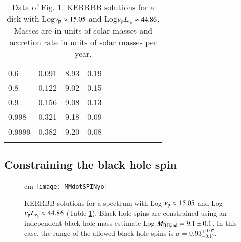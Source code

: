 \documentclass{aa}
\begin{document}
\begin{table}
\begin{tabular}{lllllllllll}
0.6	   & \hspace{3mm} 0.091 & \hspace{3mm} 8.93	& \hspace{2mm} 0.19 \\
0.8	   & \hspace{3mm} 0.122 & \hspace{3mm} 9.02	& \hspace{2mm} 0.15 \\
0.9	   & \hspace{3mm} 0.156 & \hspace{3mm} 9.08	& \hspace{2mm} 0.13 \\
0.998  & \hspace{3mm} 0.321 & \hspace{3mm} 9.18	& \hspace{2mm} 0.09 \\
0.9999 & \hspace{3mm} 0.382 & \hspace{3mm} 9.20	& \hspace{2mm} 0.08 \\
\hline \\
\end{tabular}
\caption{Data of  Fig. \ref{Methspin}. 
KERRBB solutions for a disk with Log$\nu_{\rm p} \approx 15.05$ and Log$\nu_{\rm p} L_{\nu_{\rm p}} \approx 44.86$. Masses are in units of solar masses and accretion rate in units of solar masses per year.
\label{datafig45}}
\end{table}










\subsection{Constraining the black hole spin} \label{CostrSpin}

\begin{figure}
\centering
{} cm
\texttt{[image: MMdotSPINyo]} 
\caption{
KERRBB solutions for a spectrum with Log $\nu_{\rm p} \approx 15.05$ and Log $\nu_{\rm p} L_{\nu_{\rm p}} \approx 44.86$ (Table \ref{datafig45}). Black hole spins are constrained using an independent black hole mass estimate Log $M_{\rm BH, ind} = 9.1 \pm 0.1$. In this case, the range of the allowed black hole spins is $a = 0.93^{+0.07}_{-0.17}$.}
\label{Methspin}
\end{figure}
\end{document}

